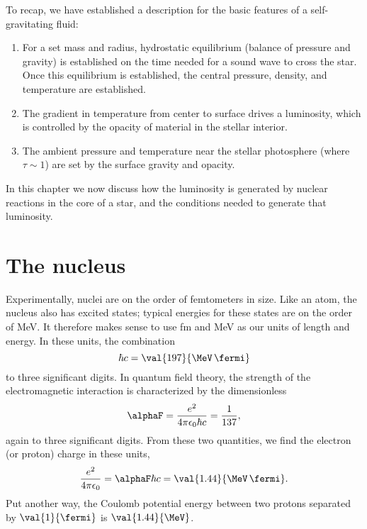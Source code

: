 
\newcommand*{\altnuc}[3]{\ensuremath{\mathrm{_{#1}^{#2}#3}}}
\newcommand*{\nucarule}{\mbox{\rule[-5pt]{3.0em}{0.5pt}}}

To recap, we have established a description for the basic features of a self-gravitating fluid:
\begin{enumerate}

\item For a set mass and radius, hydrostatic equilibrium (balance of pressure and gravity) is established on the time needed for a sound wave to cross the star. Once this equilibrium is established, the central pressure, density, and temperature are established.

\item The gradient in temperature from center to surface drives a luminosity, which is controlled by the opacity of material in the stellar interior.

\item The ambient pressure and temperature near the stellar photosphere (where $\tau \sim 1$) are set by the surface gravity and opacity.

\end{enumerate}

In this chapter we now discuss how the luminosity is generated by nuclear reactions in the core of a star, and the conditions needed to generate that luminosity.

\section{The nucleus}

Experimentally, nuclei are on the order of femtometers in size. Like an atom, the nucleus also has excited states; typical energies for these states are on the order of MeV. It therefore makes sense to use fm and MeV as our units of length and energy. In these units, the combination
\[	\hbar c = \val{197}{\MeV\,\fermi} \]
to three significant digits. In quantum field theory, the strength of the electromagnetic interaction is characterized by the dimensionless 
\[	\alphaF = \frac{e^{2}}{4\pi\epsilon_{0}\hbar c} = \frac{1}{137}, \]
again to three significant digits. From these two quantities, we find the electron (or proton) charge in these units,
\[
	\frac{e^{2}}{4\pi\epsilon_{0}} = \alphaF\hbar c = \val{1.44}{\MeV\,\fermi}.
\]
Put another way, the Coulomb potential energy between two protons separated by $\val{1}{\fermi}$ is $\val{1.44}{\MeV}$.

